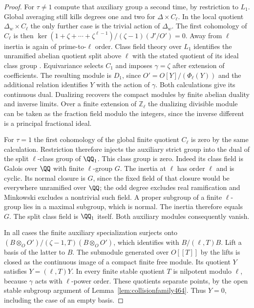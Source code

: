 \documentclass[a4paper,11pt]{article}
\theoremstyle{definition}
\theoremstyle{remark}
\newcommand{\ZZ}{\mathbb Z}\newcommand{\ord}{\operatorname{ord}}
\numberwithin{equation}{section}
\begin{document}
\begin{proof}
For \(\tau\ne1\) compute that auxiliary group a second time,
by restriction to \(L_1\). Global averaging still kills degrees
one and two for \(\Delta\times C_\ell\). In the local quotient
\(\Delta_w\times C_\ell\) the only further case is the trivial
action of \(\Delta_w\). The first cohomology of \(C_\ell\)
is then \(\ker(1+\zeta+\cdots+\zeta^{\ell-1})/
(\zeta-1)(J'/O')=0\). Away from \(\ell\) inertia is again
of prime-to-\(\ell\) order. Class field theory over \(L_1\)
identifies the unramified abelian quotient split above \(\ell\)
with the stated quotient of its ideal class group
\cite{XI-VIII-rayclass444}. Equivariance selects \(C_1\) and imposes
\(\gamma=\zeta\) after extension of coefficients. The resulting
module is \(D_1\), since \(O'=O[Y]/(\Phi_\ell(Y))\) and the
additional relation identifies \(Y\) with the action of \(\gamma\).
Both calculations give its continuous dual. Dualizing recovers
the compact modules by finite abelian duality and inverse limits.
Over a finite extension of \(\ZZ_\ell\) the dualizing divisible
module can be taken as the fraction field modulo the integers,
since the inverse different is a principal fractional ideal.

For \(\tau=1\) the first cohomology of the global finite quotient
\(C_\ell\) is zero by the same calculation. Restriction therefore
injects the auxiliary strict group into the dual of the split
\(\ell\)-class group of \(\QQ_1\). This class group is zero.
Indeed its class field is Galois over \(\QQ\) with finite
\(\ell\)-group \(G\). The inertia at \(\ell\) has order \(\ell\)
and is cyclic. Its normal closure is \(G\), since the fixed field
of that closure would be everywhere unramified over \(\QQ\);
the odd degree excludes real ramification and Minkowski excludes
a nontrivial such field. A proper subgroup of a finite
\(\ell\)-group lies in a maximal subgroup, which is normal.
The inertia therefore equals \(G\). The split class field is
\(\QQ_1\) itself. Both auxiliary modules consequently vanish.

In all cases the finite auxiliary specialization surjects onto
\((B\otimes_O O')/(\zeta-1,T)(B\otimes_O O')\), which identifies
with \(B/(\ell,T)B\). Lift a basis of the latter to \(B\).
The submodule generated over \(O[[T]]\) by the lifts is closed
as the continuous image of a compact finite free module.
Its quotient \(Y\) satisfies \(Y=(\ell,T)Y\). In every finite
stable quotient \(T\) is nilpotent modulo \(\ell\), because
\(\gamma\) acts with \(\ell\)-power order. These quotients separate
points, by the open stable subgroup argument of
Lemma~\ref{lem:collisionfamily464}. Thus \(Y=0\), including the
case of an empty basis.
\end{proof}
\end{document}
